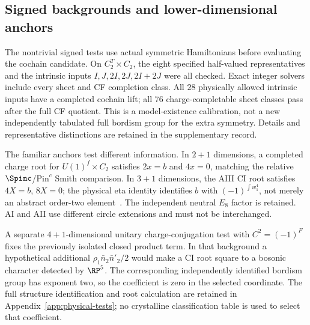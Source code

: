 \subsection{Signed backgrounds and lower-dimensional anchors}\label{subsec:3d-examples}
The nontrivial signed tests use actual symmetric Hamiltonians before evaluating the cochain candidate. On $C_2^T\times C_2$, the eight specified half-valued representatives and the intrinsic inputs $I,J,2I,2J,2I+2J$ were all checked. Exact integer solvers include every sheet and CF completion class. All $28$ physically allowed intrinsic inputs have a completed cochain lift; all $76$ charge-completable sheet classes pass after the full CF quotient. This is a model-existence calibration, not a new independently tabulated full bordism group for the extra symmetry. Details and representative distinctions are retained in the supplementary record.

The familiar anchors test different information. In $2+1$ dimensions, a completed charge root for $U(1)^f\times C_2$ satisfies $2x=b$ and $4x=0$, matching the relative $\Spinc$/$\mathrm{Pin}^c$ Smith comparison. In $3+1$ dimensions, the AIII CI root satisfies $4X=b$, $8X=0$; the physical eta identity identifies $b$ with $(-1)^{\int w_1^4}$, not merely an abstract order-two element~\cite{Metlitski,FreedHopkins,SmithFiber}. The independent neutral $E_8$ factor is retained. AI and AII use different circle extensions and must not be interchanged.

A separate $4+1$-dimensional unitary charge-conjugation test with $C^2=(-1)^F$ fixes the previously isolated closed product term. In that background a hypothetical additional $\rho_1\bar n_2\bar n'_2/2$ would make a CI root square to a bosonic character detected by $\RP^5$. The corresponding independently identified bordism group has exponent two, so the coefficient is zero in the selected coordinate. The full structure identification and root calculation are retained in Appendix~\ref{app:physical-tests}; no crystalline classification table is used to select that coefficient.
